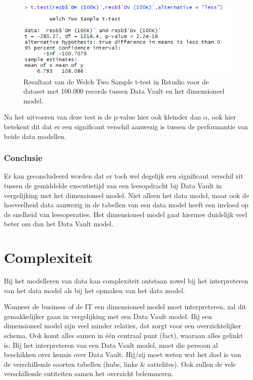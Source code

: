 \begin{figure}[h]
	\centering
	\includegraphics[scale=0.7]{../images/Ttest100000.png}
	\caption{Resultaat van de Welch Two Sample t-test in Rstudio voor de dataset met 100.000 records tussen Data Vault en het dimensioneel model. }
	\label{fig:ttest100000}
\end{figure}

Na het uitvoeren van deze test is de p-value hier ook kleinder dan $\alpha$, ook hier betekent dit dat er een significant verschil aanwezig is tussen de performantie van beide data modellen.

\subsubsection{Conclusie}
Er kan geconcludeerd worden dat er toch wel degelijk een significant verschil zit tussen de gemiddelde executietijd van een leesopdracht bij Data Vault in vergelijking met het dimensioneel model. Niet alleen het data model, maar ook de hoeveelheid data aanwezig in de tabellen van een data model heeft een invloed op de snelheid van leesoperaties. Het dimensioneel model gaat hiermee duidelijk veel beter om dan het Data Vault model. 

\section{Complexiteit}
Bij het modelleren van data kan complexiteit ontstaan zowel bij het interpreteren van het data model als bij het opmaken van het data model. 

Wanneer de business of de IT een dimensioneel model moet interpreteren, zal dit gemakkelijker gaan in vergelijking met een Data Vault model. Bij een dimensioneel model zijn veel minder relaties, dat zorgt voor een overzichtelijker schema. Ook komt alles samen in één centraal punt (fact), waaraan alles gelinkt is. Bij het interpreteren van een Data Vault model, moet die persoon al beschikken over kennis over Data Vault. Hij/zij moet weten wat het doel is van de verschillende soorten tabellen (hubs, links \& sattelites). Ook zullen de vele verschillende entiteiten samen het overzicht belemmeren. 

